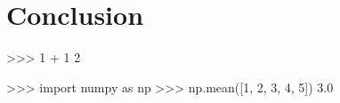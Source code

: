 \chapter{Conclusion}\label{chapter:conclusion}

\begin{usagepy}
>>> 1 + 1
2

>>> import numpy as np
>>> np.mean([1, 2, 3, 4, 5])
3.0
\end{usagepy}